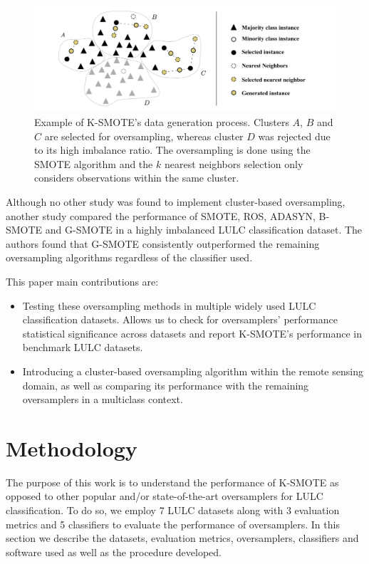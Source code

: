 \documentclass[parskip=full]{scrartcl}
\begin{document}
\begin{figure}[H]
	\centering
	\includegraphics[width=1\linewidth]{../analysis/kmeans_smote_example}
	\caption{Example of K-SMOTE's data generation process. Clusters $A$,
		$B$ and $C$ are selected for
		oversampling, whereas cluster $D$ was rejected due to its
		high imbalance ratio. The oversampling is done using the SMOTE algorithm and
		the $k$ nearest neighbors selection only considers
		observations within the same cluster.}
	\label{fig:kmeans_smote_example}
\end{figure}

Although no other study was found to implement cluster-based oversampling,
another study \cite{Douzas2019rs} compared the performance of SMOTE, ROS,
ADASYN, B-SMOTE and G-SMOTE in a highly imbalanced LULC classification dataset.
The authors found that G-SMOTE consistently outperformed the remaining
oversampling algorithms regardless of the classifier used.

This paper main contributions are:
\begin{itemize}
	\item Testing these oversampling methods in multiple widely used LULC classification
	      datasets. Allows us to check for oversamplers' performance statistical
	      significance across datasets and report K-SMOTE's performance in benchmark LULC
	      datasets.
	\item Introducing a cluster-based oversampling algorithm within the remote sensing
	      domain, as well as comparing its performance with the remaining oversamplers in
	      a multiclass context.

\end{itemize}

\section{Methodology} \label{sec:methodology}

The purpose of this work is to understand the performance of K-SMOTE as opposed
to other popular and/or state-of-the-art oversamplers for LULC classification.
To do so, we employ 7 LULC datasets along with 3 evaluation metrics and 5
classifiers to evaluate the performance of oversamplers. In this section we
describe the datasets, evaluation metrics, oversamplers, classifiers and
software used as well as the procedure developed.
\end{document}
